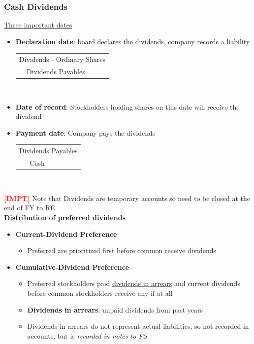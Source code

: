 \documentclass{article}
\newcommand{\impt}[0]{\textcolor{red}{\textbf{[IMPT] }}}
\begin{document}
\begin{multicols}{2}
\subsubsection{Cash Dividends}
\underline{Three important dates}
\begin{itemize}
	\item \textbf{Declaration date}: board declares the dividends, company records a liability\vspace{0.5em}\\
	\begin{tabular}{llll}
		\multicolumn{4}{l}{Dividends - Ordinary Shares}\\
		& Dividends Payables & &
	\end{tabular}\vspace{0.5em}\\
\item \textbf{Date of record}: Stockholders holding shares on this date will receive the dividend
\item \textbf{Payment date}: Company pays the dividends\vspace{0.5em}\\
\begin{tabular}{llll}
	\multicolumn{4}{l}{Dividends Payables}\\
	& Cash & &
\end{tabular}\vspace{0.5em}\\
\end{itemize}
\impt Note that Dividends are temporary accounts so need to be closed at the end of FY to RE\vspace{0.5em}\\
\textbf{Distribution of preferred dividends}
\begin{itemize}
	\item \textbf{Current-Dividend Preference}
	\begin{itemize}
		\item Preferred are prioritized first before common receive dividends
	\end{itemize}
    \item \textbf{Cumulative-Dividend Preference}
    \begin{itemize}
    	\item Preferred stockholders paid \underline{dividends in arrears} and current dividends before common stockholders receive any if at all
    	\item \textbf{Dividends in arrears}: unpaid dividends from past years
    	\item Dividends in arrears do not represent actual liabilities, so not recorded in accounts, but is \textit{recorded in notes to FS}
    \end{itemize}
\end{itemize}


\end{multicols}
\end{document}
